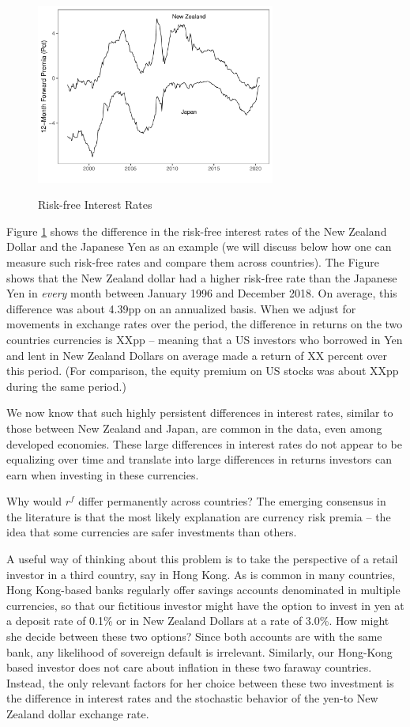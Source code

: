 \documentclass[12pt,letter]{article}
\theoremstyle{break} \theorembodyfont{\normalfont\itshape}
\theoremstyle{break}
\theoremstyle{break} \theorembodyfont{\normalfont\itshape}
\theoremstyle{break} \theorembodyfont{\normalfont\itshape}
\begin{document}
\begin{figure}
  \centering
  \caption{Risk-free Interest Rates}
  \includegraphics[width=0.7\textwidth]{Exhibits/Figure_FP12M_JPYNZD.pdf}
  \label{fig:fp}
\end{figure}
Figure \ref{fig:fp} shows the difference in the risk-free interest
rates of the New Zealand Dollar and the Japanese Yen as an example (we
will discuss below how one can measure such risk-free rates and
compare them across countries). The Figure shows that the New Zealand
dollar had a higher risk-free rate than the Japanese Yen in
\textit{every} month between January 1996 and December 2018. On
average, this difference was about 4.39pp on an annualized basis. When
we adjust for movements in exchange rates over the period, the
difference in returns on the two countries currencies is XXpp --
meaning that a US investors who borrowed in Yen and lent in New
Zealand Dollars on average made a return of XX percent over this
period. (For comparison, the equity premium on US stocks was about
XXpp during the same period.)

We now know that such highly persistent differences in interest rates,
similar to those between New Zealand and Japan, are common in the
data, even among developed economies. These large differences in
interest rates do not appear to be equalizing over time and translate
into large differences in returns investors can earn when investing in
these currencies.

Why would $r^f$ differ permanently across countries? The emerging
consensus in the literature is that the most likely explanation are
currency risk premia -- the idea that some currencies are safer
investments than others.

A useful way of thinking about this problem is to take the perspective
of a retail investor in a third country, say in Hong Kong. As is
common in many countries, Hong Kong-based banks regularly offer
savings accounts denominated in multiple currencies, so that our
fictitious investor might have the option to invest in yen at a
deposit rate of 0.1\% or in New Zealand Dollars at a rate of 3.0\%.
How might she decide between these two options? Since both accounts
are with the same bank, any likelihood of sovereign default is
irrelevant. Similarly, our Hong-Kong based investor does not care
about inflation in these two faraway countries. Instead, the only
relevant factors for her choice between these two investment is the
difference in interest rates and the stochastic behavior of the yen-to
New Zealand dollar exchange rate.
\end{document}
